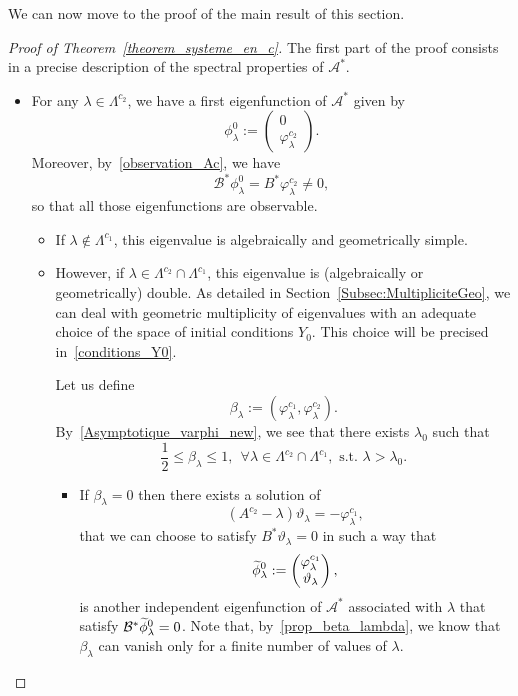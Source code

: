 \documentclass[AHL,Unicode,longabstracts]{cedram}
\newcommand{\fprop}[2]{\varphi^{#1}_{#2}}
\newcommand\As{\mathcal{A}^*}
\newcommand\Bs{\mathcal{B}^*}
\newcommand{\Fzp}{Y_0}
\let\oldtilde\tilde
\renewcommand*{\tilde}[1]{\mathchoice{\widetilde{#1}}{\widetilde{#1}}{\oldtilde{#1}}{\oldtilde{#1}}}\let\oldexists\exists
\renewcommand*{\exists}{\mathrel{\oldexists}}
\let\oldforall\forall
\renewcommand*{\forall}{\mathrel{\oldforall}}
\begin{document}
We can now move to the proof of the main result of this section.
\begin{proof}[Proof of Theorem~\ref{theorem_systeme_en_c}]
The first part of the proof consists in a precise description of the spectral properties of $\As$.
\begin{itemize}
\item For any $\lambda\in \Lambda^{c_2}$, we have a first eigenfunction of $\As$ given by
\begin{equation}\label{systeme_en_c_fp1}
\phi_{\lambda}^0 :=
\begin{pmatrix} 
0 \\ \fprop{c_2}{\lambda}
\end{pmatrix}.
\end{equation}
Moreover, by~\eqref{observation_Ac}, we have
\[
\Bs \phi_{\lambda}^0= B^*\fprop{c_2}{\lambda} \neq 0,
\]
so that all those eigenfunctions are observable.
\begin{itemize}
\item If $\lambda\not\in \Lambda^{c_1}$, this eigenvalue is algebraically and geometrically simple.
\item However, if $\lambda\in \Lambda^{c_2}\cap \Lambda^{c_1}$, this eigenvalue is (algebraically or geometrically) double. As detailed in Section~\ref{Subsec:MultipliciteGeo}, we can deal with geometric multiplicity of eigenvalues with an adequate choice of the space of initial conditions $\Fzp$. This choice will be precised in~\eqref{conditions_Y0}.

Let us define
\begin{equation}\label{def_beta_lambda}
\beta_\lambda:=(\fprop{c_1}{\lambda},\fprop{c_2}{\lambda}).
\end{equation}
By~\eqref{Asymptotique_varphi_new}, we see that there exists $\lambda_0$ such that
\begin{equation}\label{prop_beta_lambda}
\frac{1}{2} \leq \beta_\lambda\leq 1, \ \ \forall \lambda\in \Lambda^{c_2}\cap \Lambda^{c_1}, \text{ s.t. } \lambda>\lambda_0.
\end{equation}
\begin{itemize}
\item If $\beta_\lambda=0$ then there exists a solution of
\[
(A^{c_2}-\lambda) \vartheta_\lambda = - \fprop{c_1}{\lambda},
\]
that we can choose to satisfy $B^* \vartheta_\lambda=0$ in such a way that
\[
\tilde{\phi}_\lambda^0:=
\begin{pmatrix} \fprop{c_1}{\lambda} \\ \vartheta_\lambda
\end{pmatrix},
\]
is another independent eigenfunction of $\As$ associated with $\lambda$ that satisfy $\Bs \tilde{\phi}^0_\lambda=0$. Note that, by~\eqref{prop_beta_lambda}, we know that $\beta_\lambda$ can vanish only for a finite number of values of $\lambda$.


\end{itemize}
\end{itemize}
\end{itemize}
\end{proof}
\end{document}
